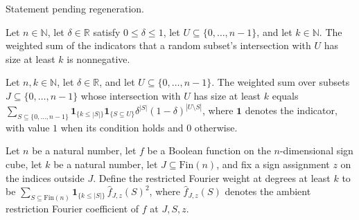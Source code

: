 \begin{theorem}
\label{FABL.one_third_le_deltaRandomIntersectionTail}
\leanok
{}
Statement pending regeneration.
\end{theorem}

\begin{theorem}
\label{FABL.deltaRandomIntersectionTail_nonneg}
\leanok
{}
Let $n\in\mathbb{N}$, let $\delta\in\mathbb{R}$ satisfy $0\le\delta\le1$, let
$U\subseteq\{0,\ldots,n-1\}$, and let $k\in\mathbb{N}$. The weighted sum of the
indicators that a random subset's intersection with $U$ has size at least $k$ is
nonnegative.
\end{theorem}

\begin{theorem}
\label{FABL.deltaRandomIntersectionTail_eq_sum}
\leanok
{}
Let $n,k\in\mathbb{N}$, let $\delta\in\mathbb{R}$, and let $U\subseteq\{0,\ldots,n-1\}$.
The weighted sum over subsets $J\subseteq\{0,\ldots,n-1\}$ whose intersection with $U$
has size at least $k$ equals $\sum_{S\subseteq\{0,\ldots,n-1\}}\mathbf{1}_{\{k\le
|S|\}}\mathbf{1}_{\{S\subseteq U\}}\delta^{|S|}(1-\delta)^{|U\setminus S|}$, where
$\mathbf{1}$ denotes the indicator, with value $1$ when its condition holds and $0$
otherwise.
\end{theorem}

\begin{definition}
\label{FABL.restrictedFourierWeightAtLeast}
\leanok
{}
Let $n$ be a natural number, let $f$ be a Boolean function on the $n$-dimensional sign
cube, let $k$ be a natural number, let $J\subseteq\mathrm{Fin}(n)$, and fix a sign
assignment $z$ on the indices outside $J$. Define the restricted Fourier weight at
degrees at least $k$ to be $\sum_{S\subseteq\mathrm{Fin}(n)}\mathbf{1}_{\{k\le
|S|\}}\,\widehat f_{J,z}(S)^2$, where $\widehat f_{J,z}(S)$ denotes the ambient
restriction Fourier coefficient of $f$ at $J,S,z$.
\end{definition}

